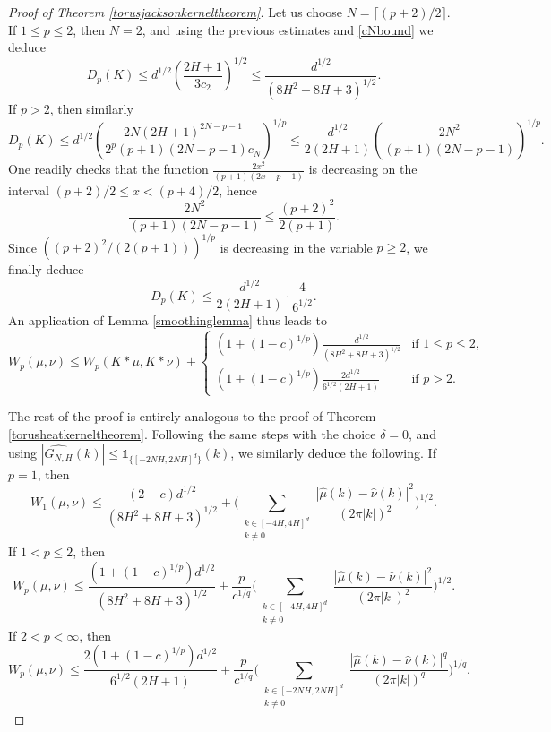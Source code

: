 \documentclass[11pt,a4paper]{article}
\theoremstyle{definition}
\begin{document}
\begin{proof}[Proof of Theorem \ref{torusjacksonkerneltheorem}]
Let us choose $N=\lceil (p+2)/2 \rceil$. If $1 \le p \le 2$, then $N=2$, and using the previous estimates and \eqref{cNbound} we deduce
\[ D_p (K) \le d^{1/2} \left( \frac{2H+1}{3 c_2} \right)^{1/2} \le \frac{d^{1/2}}{(8H^2 + 8H+3)^{1/2}} . \]
If $p>2$, then similarly
\[ D_p (K) \le d^{1/2} \left( \frac{2N(2H+1)^{2N-p-1}}{2^p (p+1)(2N-p-1) c_N} \right)^{1/p} \le \frac{d^{1/2}}{2(2H+1)} \left( \frac{2N^2}{(p+1)(2N-p-1)} \right)^{1/p} . \]
One readily checks that the function $\frac{2x^2}{(p+1)(2x-p-1)}$ is decreasing on the interval $(p+2)/2 \le x < (p+4)/2$, hence
\[ \frac{2N^2}{(p+1)(2N-p-1)} \le \frac{(p+2)^2}{2(p+1)} . \]
Since $((p+2)^2 / (2(p+1)))^{1/p}$ is decreasing in the variable $p \ge 2$, we finally deduce
\[ D_p (K) \le \frac{d^{1/2}}{2 (2H+1)} \cdot \frac{4}{6^{1/2}} . \]
An application of Lemma \ref{smoothinglemma} thus leads to
\begin{equation}\label{torusjacksonkernelstep1}
W_p (\mu, \nu) \le W_p (K*\mu, K*\nu) + \left\{ \begin{array}{ll} (1+(1-c)^{1/p}) \frac{d^{1/2}}{(8H^2 + 8H+3)^{1/2}} & \textrm{if } 1 \le p \le 2, \\ (1+(1-c)^{1/p}) \frac{2 d^{1/2}}{6^{1/2} (2H+1)} & \textrm{if } p>2. \end{array} \right.
\end{equation}

The rest of the proof is entirely analogous to the proof of Theorem \ref{torusheatkerneltheorem}. Following the same steps with the choice $\delta=0$, and using $|\widehat{G_{N,H}}(k)| \le \mathds{1}_{\{ [-2NH, 2NH]^d \}}(k)$, we similarly deduce the following. If $p=1$, then
\[ W_1 (\mu, \nu) \le \frac{(2-c)d^{1/2}}{(8H^2 + 8H+3)^{1/2}} + \Bigg( \sum_{\substack{k \in [-4H,4H]^d \\ k \neq 0}} \frac{|\widehat{\mu}(k) - \widehat{\nu}(k)|^2}{(2 \pi |k|)^2} \Bigg)^{1/2} . \]
If $1<p \le 2$, then
\[ W_p (\mu, \nu) \le \frac{(1+(1-c)^{1/p})d^{1/2}}{(8H^2+8H+3)^{1/2}} + \frac{p}{c^{1/q}} \Bigg( \sum_{\substack{k \in [-4H,4H]^d \\ k \neq 0}} \frac{|\widehat{\mu}(k) - \widehat{\nu}(k)|^2}{(2 \pi |k|)^2} \Bigg)^{1/2} . \]
If $2<p<\infty$, then
\[ W_p(\mu, \nu) \le \frac{2(1+(1-c)^{1/p}) d^{1/2}}{6^{1/2}(2H+1)} + \frac{p}{c^{1/q}} \Bigg( \sum_{\substack{k \in [-2NH,2NH]^d \\ k \neq 0}} \frac{|\widehat{\mu}(k) - \widehat{\nu}(k)|^q}{(2 \pi |k|)^q} \Bigg)^{1/q} . \]


\end{proof}
\end{document}
